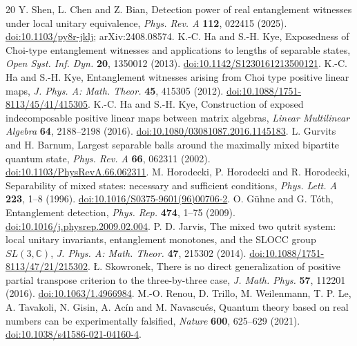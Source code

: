 \documentclass[11pt,a4paper]{article}
\theoremstyle{definition}\newtheorem{definition}[theorem]{Definition}\newtheorem*{conj}{Conjecture 9 of Shen, Chen and Bian}\newtheorem{remark}[theorem]{Remark}
\begin{document}
\begin{thebibliography}{20}\small
{} Y. Shen, L. Chen and Z. Bian, Detection power of real entanglement witnesses under local unitary equivalence, \emph{Phys. Rev. A} \textbf{112}, 022415 (2025). \href{https://doi.org/10.1103/py8r-jklj}{doi:10.1103/py8r-jklj}; arXiv:2408.08574.
 K.-C. Ha and S.-H. Kye, Exposedness of Choi-type entanglement witnesses and applications to lengths of separable states, \emph{Open Syst. Inf. Dyn.} \textbf{20}, 1350012 (2013). \href{https://doi.org/10.1142/S1230161213500121}{doi:10.1142/S1230161213500121}.
 K.-C. Ha and S.-H. Kye, Entanglement witnesses arising from Choi type positive linear maps, \emph{J. Phys. A: Math. Theor.} \textbf{45}, 415305 (2012). \href{https://doi.org/10.1088/1751-8113/45/41/415305}{doi:10.1088/1751-8113/45/41/415305}.
 K.-C. Ha and S.-H. Kye, Construction of exposed indecomposable positive linear maps between matrix algebras, \emph{Linear Multilinear Algebra} \textbf{64}, 2188--2198 (2016). \href{https://doi.org/10.1080/03081087.2016.1145183}{doi:10.1080/03081087.2016.1145183}.
 L. Gurvits and H. Barnum, Largest separable balls around the maximally mixed bipartite quantum state, \emph{Phys. Rev. A} \textbf{66}, 062311 (2002). \href{https://doi.org/10.1103/PhysRevA.66.062311}{doi:10.1103/PhysRevA.66.062311}.
 M. Horodecki, P. Horodecki and R. Horodecki, Separability of mixed states: necessary and sufficient conditions, \emph{Phys. Lett. A} \textbf{223}, 1--8 (1996). \href{https://doi.org/10.1016/S0375-9601(96)00706-2}{doi:10.1016/S0375-9601(96)00706-2}.
 O. G\"uhne and G. T\'oth, Entanglement detection, \emph{Phys. Rep.} \textbf{474}, 1--75 (2009). \href{https://doi.org/10.1016/j.physrep.2009.02.004}{doi:10.1016/j.physrep.2009.02.004}.
 P. D. Jarvis, The mixed two qutrit system: local unitary invariants, entanglement monotones, and the SLOCC group $SL(3,\mathbb C)$, \emph{J. Phys. A: Math. Theor.} \textbf{47}, 215302 (2014). \href{https://doi.org/10.1088/1751-8113/47/21/215302}{doi:10.1088/1751-8113/47/21/215302}.
 \L. Skowronek, There is no direct generalization of positive partial transpose criterion to the three-by-three case, \emph{J. Math. Phys.} \textbf{57}, 112201 (2016). \href{https://doi.org/10.1063/1.4966984}{doi:10.1063/1.4966984}.
 M.-O. Renou, D. Trillo, M. Weilenmann, T. P. Le, A. Tavakoli, N. Gisin, A. Ac\'{i}n and M. Navascu\'{e}s, Quantum theory based on real numbers can be experimentally falsified, \emph{Nature} \textbf{600}, 625--629 (2021). \href{https://doi.org/10.1038/s41586-021-04160-4}{doi:10.1038/s41586-021-04160-4}.

\end{thebibliography}
\end{document}
